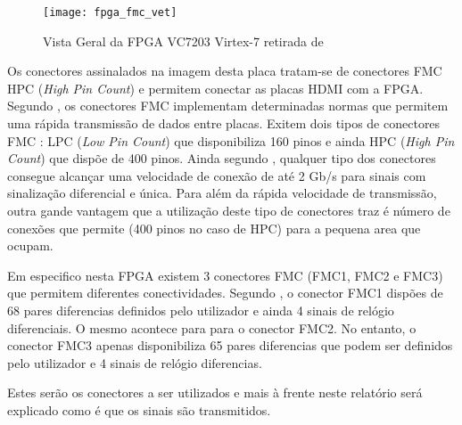 \begin{figure}[h!]
	\begin{center}
		\leavevmode
		\texttt{[image: fpga\_fmc\_vet]}
		\caption{Vista Geral da FPGA VC7203 Virtex-7 retirada de \cite{R008}}
		\label{fig:fpgaVistaGeral}
	\end{center}
\end{figure}

Os conectores assinalados na imagem desta placa tratam-se de conectores FMC HPC (\textit{High Pin Count}) e permitem conectar as placas HDMI com a FPGA. Segundo \cite{R030}, os conectores FMC implementam determinadas normas que permitem uma rápida transmissão de dados entre placas. Exitem dois tipos de conectores FMC : LPC (\textit{Low Pin Count}) que disponibiliza 160 pinos e ainda HPC (\textit{High Pin Count}) que dispõe de 400 pinos. Ainda segundo \cite{R030}, qualquer tipo dos conectores consegue alcançar uma velocidade de conexão de até 2 Gb/s para sinais com sinalização diferencial e única. Para além da rápida velocidade de transmissão, outra gande vantagem que a utilização deste tipo de conectores traz é número de conexões que permite (400 pinos no caso de HPC) para a pequena area que ocupam. 

Em especifico nesta FPGA existem 3 conectores FMC (FMC1, FMC2 e FMC3) que permitem diferentes conectividades. Segundo \cite{R008}, o conector FMC1 dispões de 68 pares diferencias definidos pelo utilizador e ainda 4 sinais de relógio diferenciais. O mesmo acontece para para o conector FMC2. No entanto, o conector FMC3 apenas disponibiliza 65 pares diferencias que podem ser definidos pelo utilizador e 4 sinais de relógio diferencias.

Estes serão os conectores a ser utilizados e mais à frente neste relatório será explicado como é que os sinais são transmitidos. 


